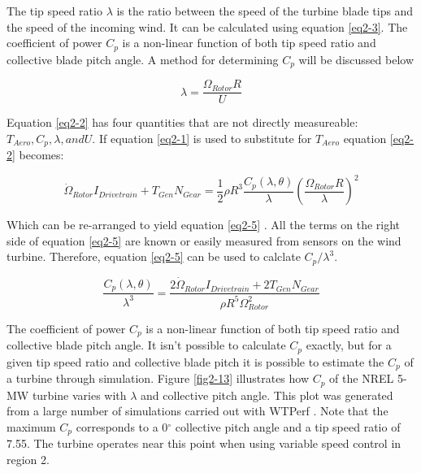 The tip speed ratio $\lambda$ is the ratio between the speed of the turbine blade tips and the speed of the incoming wind. It can be calculated using equation \ref{eq2-3}. The coefficient of power $C_p$ is a non-linear function of both tip speed ratio and collective blade pitch angle. A method for determining $C_p$ will be discussed below

\begin{equation}
	\lambda=\frac{\Omega_{Rotor} R}{U} \label{eq2-3}
\end{equation}

Equation \ref{eq2-2} has four quantities that are not directly measureable: $T_{Aero}, C_p, \lambda, and U$. If equation \ref{eq2-1} is used to substitute for $T_{Aero}$ equation \ref{eq2-2} becomes:

\begin{equation}
	\dot{\Omega }_{Rotor} I_{Drivetrain} + T_{Gen} N_{Gear} = \frac{1}{2} \rho R^3 \frac{C_p ( \lambda , \theta )}{\lambda} \left(\frac{\Omega_{Rotor} R}{\lambda}\right)^2   \label{eq2-4}
\end{equation}

Which can be re-arranged to yield equation \ref{eq2-5} . All the terms on the right side of equation \ref{eq2-5} are known or easily measured from sensors on the wind turbine. Therefore, equation \ref{eq2-5} can be used to calclate $C_p / \lambda^3$.

\begin{equation}
	 \frac{C_p ( \lambda, \theta)}{\lambda^3} = \frac{2 \dot{\Omega}_{Rotor} I_{Drivetrain} + 2 T_{Gen} N_{Gear}}{\rho R^5 \Omega^2_{Rotor}} \label{eq2-5}
\end{equation}


The coefficient of power $C_p$ is a non-linear function of both tip speed ratio and collective blade pitch angle. It isn’t possible to calculate $C_p$ exactly, but for a given tip speed ratio and collective blade pitch it is possible to estimate the $C_p$ of a turbine through simulation.  Figure \ref{fig2-13} illustrates how $C_p$ of the NREL 5-MW turbine varies with $\lambda$ and collective pitch angle. This plot was generated from a large number of simulations carried out with WTPerf \cite{platt2012}. Note that the maximum $C_p$ corresponds to a 0$^\circ$ collective pitch angle and a tip speed ratio of 7.55. The turbine operates near this point when using variable speed control in region 2. 

